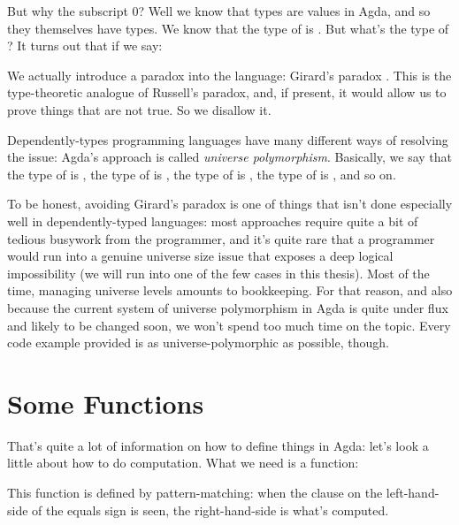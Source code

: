 But why the subscript 0?
Well we know that types are values in Agda, and so they themselves have types.
We know that the type of  is
.
But what's the type of ?
It turns out that if we say:
We actually introduce a paradox into the language: Girard's paradox
\cite{girardInterpretationFonctionelleElimination1972}.
This is the type-theoretic analogue of Russell's paradox, and, if present, it
would allow us to prove things that are not true.
So we disallow it.

Dependently-types programming languages have many different ways of resolving
the issue: Agda's approach is called \emph{universe polymorphism}.
Basically, we say that the type of  is
, the type of  is
, the type of 
is , the type of 
is , and so on.

To be honest, avoiding Girard's paradox is one of things that isn't done
especially well in dependently-typed languages: most approaches require quite a
bit of tedious busywork from the programmer, and it's quite rare that a
programmer would run into a genuine universe size issue that exposes a deep
logical impossibility (we will run into one of the few cases in this thesis).
Most of the time, managing universe levels amounts to bookkeeping.
For that reason, and also because the current system of universe polymorphism in
Agda is quite under flux and likely to be changed soon, we won't spend too much
time on the topic.
Every code example provided is as universe-polymorphic as possible, though.
\section{Some Functions}
That's quite a lot of information on how to define things in Agda: let's look a
little about how to do computation.
What we need is a function:
\begin{agdalisting*}
\end{agdalisting*}
This function is defined by pattern-matching: when the clause on the
left-hand-side of the equals sign is seen, the right-hand-side is what's
computed.


